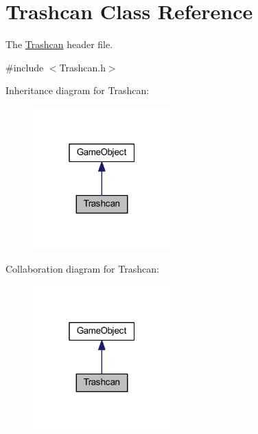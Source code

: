 \hypertarget{class_trashcan}{\section{Trashcan Class Reference}
\label{class_trashcan}
}


The \hyperlink{class_trashcan}{Trashcan} header file.  




{\ttfamily \#include $<$Trashcan.\+h$>$}



Inheritance diagram for Trashcan\+:\nopagebreak
\begin{figure}[H]
\begin{center}
\leavevmode
\includegraphics[width=151pt]{class_trashcan__inherit__graph}
\end{center}
\end{figure}


Collaboration diagram for Trashcan\+:\nopagebreak
\begin{figure}[H]
\begin{center}
\leavevmode
\includegraphics[width=151pt]{class_trashcan__coll__graph}
\end{center}
\end{figure}
